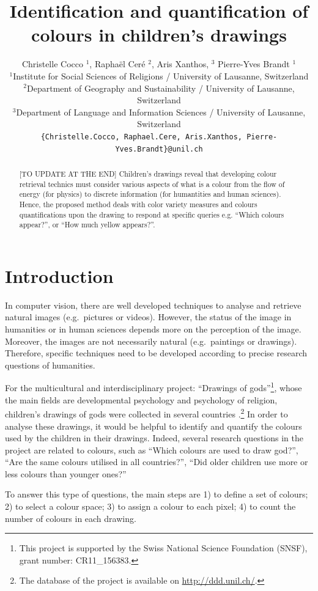 \documentclass[11pt,a4paper]{article}
\title{Identification and quantification of colours in children's drawings}
\author{Christelle Cocco ${}^1$, Rapha\"el Cer\'e ${}^2$, Aris Xanthos, ${}^3$  Pierre-Yves Brandt ${}^1$\\
  ${}^1$Institute for Social Sciences of Religions / University of Lausanne, Switzerland \\
  ${}^2$Department of Geography and Sustainability / University of Lausanne, Switzerland \\
  ${}^3$Department of Language and Information Sciences / University of Lausanne, Switzerland \\
  {\tt \{Christelle.Cocco, Raphael.Cere, Aris.Xanthos, Pierre-Yves.Brandt\}@unil.ch} \\
  }
\date{}
\begin{document}
\maketitle
\begin{abstract}
[TO UPDATE AT THE END] Children's drawings reveal that developing colour retrieval technics
must consider various aspects of what is a colour from the flow of
energy (for physics) to discrete information (for humantities and human
sciences). Hence, the proposed method deals with color variety measures
and colours quantifications upon the drawing to respond at specific
queries e.g. ``Which colours appear?'', or ``How much yellow appears?''.
\end{abstract}


\section{Introduction}\label{introduction}

In computer vision, there are well developed techniques to analyse and retrieve natural images (e.g.~pictures or videos). 
However, the status of the image in humanities or in human sciences depends more on the perception of the image. Moreover, the images are not necessarily natural (e.g.~paintings or drawings). Therefore, specific techniques need to be developed according to precise research questions of humanities.

For the multicultural and interdisciplinary project: ``Drawings of gods''\footnote{This project is supported by the Swiss National Science Foundation (SNSF), grant number: CR11\_156383.}, whose the main fields are developmental psychology and psychology of religion, children's drawings of gods were collected in several countries \cite[for more details about this project, see \textit{e.g.}][]{BrandtKagataSpittelerGillieronPaleologue2009,Dandarova2013,DandarovaRobertDessartSerbaevaEtAl2016}.\footnote{The database of the project is available on \url{http://ddd.unil.ch/}.} 
In order to analyse these drawings, it would be helpful to identify and quantify the colours used by the children in their drawings. 
Indeed, several research questions in the project are related to colours, such as ``Which colours are used to draw god?'', ``Are the same colours utilised in all countries?'', ``Did older children use more or less colours than younger ones?''

To answer this type of questions, the main steps are 1) to define a set of colours; 2) to select a colour space; 3) to assign a colour to each pixel; 4) to count the number of colours in each drawing.
\end{document}
